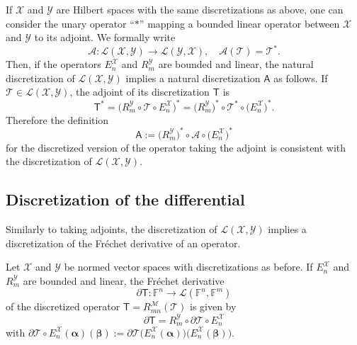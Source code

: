 \documentclass[a4paper]{paper}
\newcommand{\VecSpace}[1]{\mathscr{#1}}
\newcommand{\Field}{\mathbb{F}}
\newcommand{\Op}[1]{\mathcal{#1}}
\newcommand{\DiscOp}[1]{\mathsf{#1}}
\newcommand*{\REST}[2]{\ensuremath{R_{#1}^{#2}}}
\newcommand{\valpha}{\boldsymbol{\alpha}}
\newcommand{\vbeta}{\boldsymbol{\beta}}
\begin{document}
If $\VecSpace{X}$ and $\VecSpace{Y}$ are Hilbert spaces with the same discretizations as above, one can consider the unary operator 
``$\ast$'' mapping a bounded linear operator between $\VecSpace{X}$ and $\VecSpace{Y}$ to its adjoint. We formally write
\[
  \Op{A}: \VecSpace{L}(\VecSpace{X}, \VecSpace{Y}) \to \VecSpace{L}(\VecSpace{Y}, \VecSpace{X}), \quad \Op{A}(\Op{T}) = \Op{T}^*.
\]
Then, if the operators $E_n^{\VecSpace{X}}$ and $R_m^{\VecSpace{Y}}$ are bounded and linear, the natural discretization of 
$\VecSpace{L}(\VecSpace{X}, \VecSpace{Y})$ implies a natural discretization $\DiscOp{A}$ as follows. If $\Op{T} \in 
\VecSpace{L}(\VecSpace{X}, \VecSpace{Y})$, the adjoint of its discretization $\DiscOp{T}$ is
\[
 \DiscOp{T}^* = \big( R_m^{\VecSpace{Y}} \circ \Op{T} \circ E_n^{\VecSpace{X}} \big)^* = \big( R_m^{\VecSpace{Y}} \big)^* \circ \Op{T}^* 
\circ  \big( E_n^{\VecSpace{X}} \big)^*.
\]
Therefore the definition
\[
  \DiscOp{A} := \big( R_m^{\VecSpace{Y}} \big)^* \circ \Op{A} \circ \big( E_n^{\VecSpace{X}} \big)^*
\]
for the discretized version of the operator taking the adjoint is consistent with the discretization of $\VecSpace{L}(\VecSpace{X}, 
\VecSpace{Y})$.


\subsection{Discretization of the differential}

Similarly to taking adjoints, the discretization of $\VecSpace{L}(\VecSpace{X}, \VecSpace{Y})$ implies a discretization of the Fr\'{e}chet 
derivative of an operator.

\begin{theorem}
 Let $\VecSpace{X}$ and $\VecSpace{Y}$ be normed vector spaces with discretizations as before. If $E_n^{\VecSpace{X}}$ and 
 $R_m^{\VecSpace{Y}}$ are bounded and linear, the Fr\'{e}chet derivative
 \[
  \partial\DiscOp{T}: \Field^n \to \VecSpace{L}(\Field^n, \Field^m)
 \]
 of the discretized operator $\DiscOp{T} = \REST{mn}{\VecSpace{M}} (\Op{T})$ is given by
 \[
  \partial\DiscOp{T} = R_m^{\VecSpace{Y}} \circ \partial\Op{T} \circ E_n^{\VecSpace{X}}
 \]
 with $\partial\Op{T} \circ E_n^{\VecSpace{X}}(\valpha)(\vbeta):= \partial\Op{T}\big(E_n^{\VecSpace{X}}(\valpha)\big) 
 \big(E_n^{\VecSpace{X}}(\vbeta)\big)$. 
\end{theorem}
\end{document}

